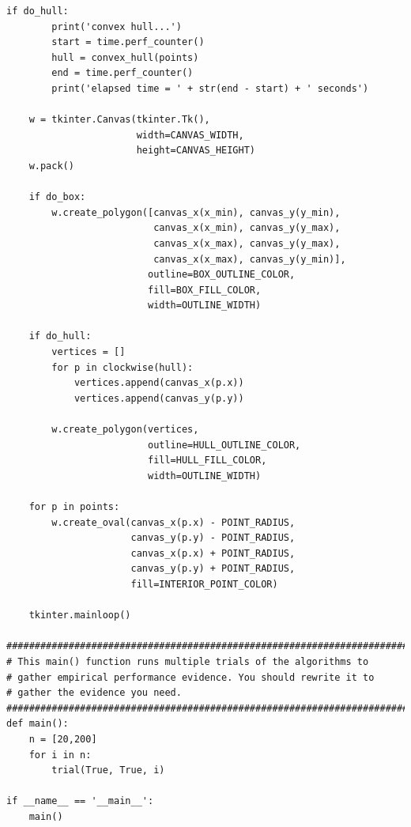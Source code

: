 \documentclass[09pt]{article}
\begin{document}
\begin{lstlisting}[frame=single]
    if do_hull:
        print('convex hull...')
        start = time.perf_counter()
        hull = convex_hull(points)
        end = time.perf_counter()
        print('elapsed time = ' + str(end - start) + ' seconds')

    w = tkinter.Canvas(tkinter.Tk(),
                       width=CANVAS_WIDTH, 
                       height=CANVAS_HEIGHT)
    w.pack()

    if do_box:
        w.create_polygon([canvas_x(x_min), canvas_y(y_min),
                          canvas_x(x_min), canvas_y(y_max),
                          canvas_x(x_max), canvas_y(y_max),
                          canvas_x(x_max), canvas_y(y_min)],
                         outline=BOX_OUTLINE_COLOR,
                         fill=BOX_FILL_COLOR,
                         width=OUTLINE_WIDTH)

    if do_hull:
        vertices = []
        for p in clockwise(hull):
            vertices.append(canvas_x(p.x))
            vertices.append(canvas_y(p.y))

        w.create_polygon(vertices,
                         outline=HULL_OUTLINE_COLOR,
                         fill=HULL_FILL_COLOR,
                         width=OUTLINE_WIDTH)

    for p in points:
        w.create_oval(canvas_x(p.x) - POINT_RADIUS,
                      canvas_y(p.y) - POINT_RADIUS,
                      canvas_x(p.x) + POINT_RADIUS,
                      canvas_y(p.y) + POINT_RADIUS,
                      fill=INTERIOR_POINT_COLOR)

    tkinter.mainloop()

##############################################################################
# This main() function runs multiple trials of the algorithms to
# gather empirical performance evidence. You should rewrite it to
# gather the evidence you need.
##############################################################################
def main():
    n = [20,200]
    for i in n:
        trial(True, True, i)

if __name__ == '__main__':
    main()
\end{lstlisting}
\end{document}
